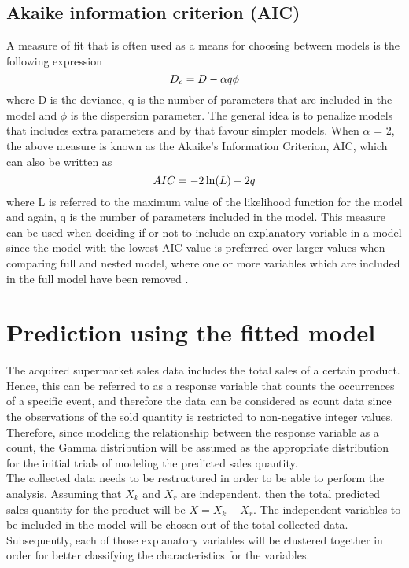 \subsection{Akaike information criterion (AIC)}
A measure of fit that is often used as a means for choosing between models is the following expression
\begin{equation}
	\centering
	D_c= D-\alpha q \phi
\end{equation}
where D is the deviance, q is the number of parameters that are included in the model and $\phi$ is the dispersion parameter. The general idea is to penalize models that includes extra parameters 
and by that favour simpler models. When $\alpha$ = 2, the above measure is known as the Akaike’s Information Criterion, AIC, which can also be written as
\begin{equation}
	\centering
	AIC = -2\ln(L) + 2q
\end{equation}
where L is referred to the maximum value of the likelihood function for the model and again, q is the number of parameters included in the model. This measure can be used when deciding if or not to include an explanatory variable in a model since the model with the lowest AIC value is preferred over larger values when comparing full and nested model, where one or more 
variables which are included in the full model have been removed \cite{Montgomery}.
\section{Prediction using the fitted model}
The acquired supermarket sales data includes the total sales of a certain product. Hence, this can be referred to as a response variable that counts the occurrences of a specific event, and therefore the data can be considered as count data since the observations of the sold quantity is restricted to non-negative integer values. Therefore, since modeling the relationship between the response variable as a count, the Gamma distribution will be assumed as the appropriate distribution for the initial trials of modeling the predicted sales quantity.\\
The collected data needs to be restructured in order to be able to perform the analysis. Assuming that $X_{k}$ and $X_{r}$ are independent, then the total predicted sales quantity for the product will be $X=X_{k}-X_{r}$. The independent variables to be included in the model will be chosen out of the total collected data. Subsequently, each of those explanatory variables will be clustered together in order for better classifying the characteristics for the variables.
